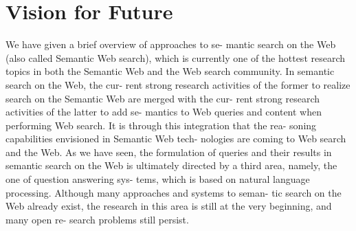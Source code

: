 \documentclass[12pt,a4]{article}
\begin{document}
  


\section{Vision for Future}
We have given a brief overview of approaches to se-
mantic search on the Web (also called Semantic Web
search), which is currently one of the hottest research
topics in both the Semantic Web and the Web search
community. In semantic search on the Web, the cur-
rent strong research activities of the former to realize
search on the Semantic Web are merged with the cur-
rent strong research activities of the latter to add se-
mantics to Web queries and content when performing
Web search. It is through this integration that the rea-
soning capabilities envisioned in Semantic Web tech-
nologies are coming to Web search and the Web. As we
have seen, the formulation of queries and their results
in semantic search on the Web is ultimately directed by
a third area, namely, the one of question answering sys-
tems, which is based on natural language processing.
Although many approaches and systems to seman-
tic search on the Web already exist, the research in this
area is still at the very beginning, and many open re-
search problems still persist.
\end{document}
